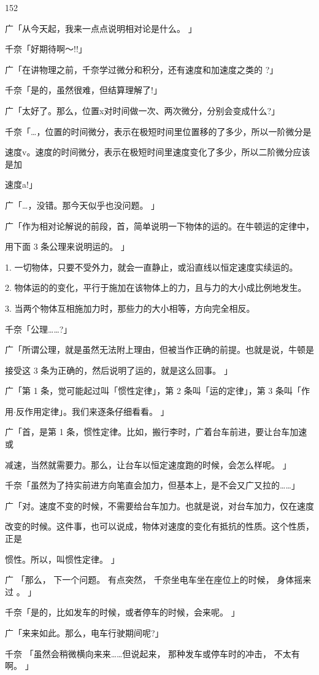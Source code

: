 152\par
广「从今天起，我来一点点说明相对论是什么。 」\par
千奈「好期待啊～!!」\par
广「在讲物理之前，千奈学过微分和积分，还有速度和加速度之类的 ?」\par
千奈「是的，虽然很难，但结算理解了!」\par
广「太好了。那么，位置x对时间做一次、两次微分，分别会变成什么?」\par
千奈「…，位置的时间微分，表示在极短时间里位置移的了多少，所以一阶微分是\par
速度v。速度的时间微分，表示在极短时间里速度变化了多少，所以二阶微分应该是加\par
速度a!」\par
广「…，没错。那今天似乎也没问题。 」\par
广「作为相对论解说的前段，首，简单说明一下物体的运的。在牛顿运的定律中，\par
用下面 3 条公理来说明运的。 」\par
1. 一切物体，只要不受外力，就会一直静止，或沿直线以恒定速度实续运的。\par
2. 物体运的的变化，平行于施加在该物体上的力，且与力的大小成比例地发生。\par
3. 当两个物体互相施加力时，那些力的大小相等，方向完全相反。\par
千奈「公理……?」\par
广「所谓公理，就是虽然无法附上理由，但被当作正确的前提。也就是说，牛顿是\par
接受这 3 条为正确的，然后说明了运的，就是这么回事。 」\par
广「第 1 条，觉可能起过叫「惯性定律」，第 2 条叫「运的定律」，第 3 条叫「作\par
用$\cdot$反作用定律」。我们来逐条仔细看看。 」\par
广「首，是第 1 条，惯性定律。比如，搬行李时，广着台车前进，要让台车加速或\par
减速，当然就需要力。那么，让台车以恒定速度跑的时候，会怎么样呢。 」\par
千奈「虽然为了持实前进方向笔直会加力，但基本上，是不会又广又拉的……」\par
广「对。速度不变的时候，不需要给台车加力。也就是说，对台车加力，仅在速度\par
改变的时候。这件事，也可以说成，物体对速度的变化有抵抗的性质。这个性质，正是\par
惯性。所以，叫惯性定律。 」\par
广 「那么， 下一个问题。 有点突然， 千奈坐电车坐在座位上的时候， 身体摇来过 。 」\par
千奈「是的，比如发车的时候，或者停车的时候，会来呢。 」\par
广「来来如此。那么，电车行驶期间呢?」\par
千奈 「虽然会稍微横向来来……但说起来， 那种发车或停车时的冲击， 不太有啊。 」\par

